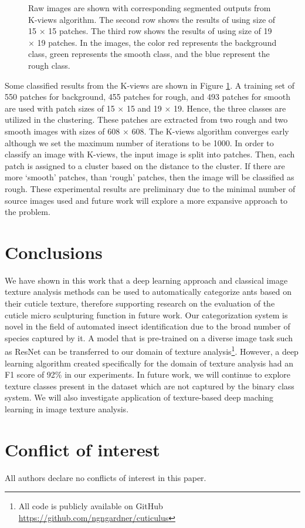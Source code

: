 \documentclass{aci}
\numberwithin{equation}{section}
\begin{document}
\begin{figure}
\begin{subfigure}{\segmentedsubwidth}
    \end{subfigure}
    \caption{Raw images are shown with corresponding segmented outputs from
        K-views algorithm. The second row shows the results of using size of 15
        $\times$ 15 patches. The third row shows the results of using size of 19
        $\times$ 19 patches. In the images, the color red represents the
        background class, green represents the smooth class, and the blue
        represent the rough class.}
    \label{fig:kviews_segmented}
\end{figure}

\FloatBarrier Some classified results from the K-views are shown in Figure
\ref{fig:kviews_segmented}. A training set of 550 patches for background, 455
patches for rough, and 493 patches for smooth are used with patch sizes of 15
$\times$ 15 and 19 $\times$ 19. Hence, the three classes are utilized in the
clustering. These patches are extracted from two rough and two smooth images
with sizes of 608 $\times$ 608. The K-views algorithm converges early although
we set the maximum number of iterations to be 1000. In order to classify an
image with K-views, the input image is split into patches. Then, each patch is
assigned to a cluster based on the distance to the cluster. If there are more
`smooth' patches, than `rough' patches, then the image will be classified as
rough. These experimental results are preliminary due to the minimal number of
source images used and future work will explore a more expansive approach to the
problem.


\section{Conclusions}
We have shown in this work that a deep learning approach and classical image
texture analysis methods can be used to automatically categorize ants based on
their cuticle texture, therefore supporting research on the evaluation of the
cuticle micro sculpturing function in future work. Our categorization system is
novel in the field of automated insect identification due to the broad number of
species captured by it. A model that is pre-trained on a diverse image task such
as ResNet can be transferred to our domain of texture analysis\footnote{All code
    is publicly available on GitHub \url{https://github.com/ngngardner/cuticulus}}.
However, a deep learning algorithm created specifically for the domain of
texture analysis had an F1 score of 92\% in our experiments. In future work, we
will continue to explore texture classes present in the dataset which are not
captured by the binary class system. We will also investigate application of
texture-based deep maching learning in image texture analysis.

\section*{Conflict of interest}
All authors declare no conflicts of interest in this paper.



\end{document}

